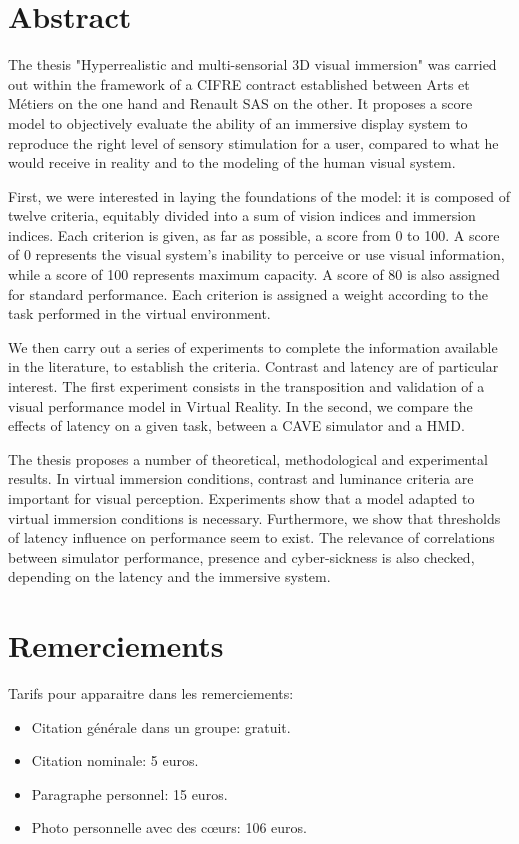 \chapter*{Abstract}
\par The thesis "Hyperrealistic and multi-sensorial 3D visual immersion" was carried out within the framework of a CIFRE contract established between Arts et Métiers on the one hand and Renault SAS on the other. It proposes a score model to objectively evaluate the ability of an immersive display system to reproduce the right level of sensory stimulation for a user, compared to what he would receive in reality and to the modeling of the human visual system.

\par First, we were interested in laying the foundations of the model: it is composed of twelve criteria, equitably divided into a sum of vision indices and immersion indices. Each criterion is given, as far as possible, a score from 0 to 100. A score of 0 represents the visual system's inability to perceive or use visual information, while a score of 100 represents maximum capacity. A score of 80 is also assigned for standard performance. Each criterion is assigned a weight according to the task performed in the virtual environment.

\par We then carry out a series of experiments to complete the information available in the literature, to establish the criteria. Contrast and latency are of particular interest. The first experiment consists in the transposition and validation of a visual performance model in Virtual Reality. In the second, we compare the effects of latency on a given task, between a CAVE simulator and a HMD.

\par The thesis proposes a number of theoretical, methodological and experimental results. In virtual immersion conditions, contrast and luminance criteria are important for visual perception. Experiments show that a model adapted to virtual immersion conditions is necessary. Furthermore, we show that thresholds of latency influence on performance seem to exist. The relevance of correlations between simulator performance, presence and cyber-sickness is also checked, depending on the latency and the immersive system.

\chapter*{Remerciements}
\par Tarifs pour apparaitre dans les remerciements:
\begin{itemize}
	\item Citation générale dans un groupe: gratuit.
	\item Citation nominale: 5 euros.
	\item Paragraphe personnel: 15 euros.
	\item Photo personnelle avec des cœurs: 106 euros.
\end{itemize}
